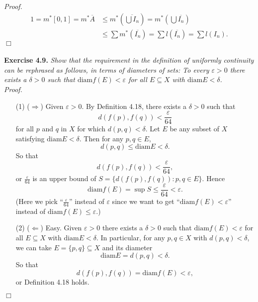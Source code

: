 \documentclass{article}
\begin{document}
\emph{Proof.}
\begin{align*}
1
= m^{*}[0, 1]
= m^{*}\overline{A}
&\leq m^{*}\left( \overline{\bigcup I_n} \right)
= m^{*}\left( \bigcup \overline{I_n} \right) \\
&\leq \sum m^{*}(\overline{I_n})
= \sum l(\overline{I_n})
= \sum l(I_n).
\end{align*}
$\Box$ \\\\






\textbf{Exercise 4.9.}
\emph{Show that the requirement in the definition of uniformly continuity
can be rephrased as follows, in terms of diameters of sets:
To every $\varepsilon > 0$ there exists a $\delta > 0$ such that
$\mathrm{diam}f(E) < \varepsilon$ for all $E \subseteq X$ with
$\mathrm{diam}E < \delta$.} \\

\emph{Proof.}
\begin{enumerate}
\item[(1)]
($\Longrightarrow$)
Given $\varepsilon > 0$.
By Definition 4.18, there exists a $\delta > 0$ such that
\[
  d(f(p),f(q)) < \frac{\varepsilon}{64}
\]
for all $p$ and $q$ in $X$ for which $d(p,q) < \delta$.
Let $E$ be any subset of $X$ satisfying $\mathrm{diam}E < \delta$.
Then for any $p, q \in E$,
\[
  d(p,q) \leq \mathrm{diam}E < \delta.
\]
So that
\[
  d(f(p),f(q)) < \frac{\varepsilon}{64},
\]
or $\frac{\varepsilon}{64}$ is an upper bound of $S = \{d(f(p),f(q)) : p, q \in E\}$.
Hence
\[
  \mathrm{diam}f(E) = \sup S \leq \frac{\varepsilon}{64} < \varepsilon.
\]
(Here we pick ``$\frac{\varepsilon}{64}$'' instead of $\varepsilon$
since we want to get ``$\mathrm{diam}f(E) < \varepsilon$''
instead of $\mathrm{diam}f(E) \leq \varepsilon$.)

\item[(2)]
($\Longleftarrow$)
Easy.
Given $\varepsilon > 0$ there exists a $\delta > 0$ such that
$\mathrm{diam}f(E) < \varepsilon$ for all $E \subseteq X$ with
$\mathrm{diam}E < \delta$.
In particular, for any $p, q \in X$ with $d(p,q) < \delta$,
we can take $E = \{p,q\} \subseteq X$ and its diameter
\[
  \mathrm{diam}E = d(p,q) < \delta.
\]
So that
\[
  d(f(p),f(q)) = \mathrm{diam}f(E) < \varepsilon,
\]
or Definition 4.18 holds.
\end{enumerate}
$\Box$ \\\\
\end{document}
